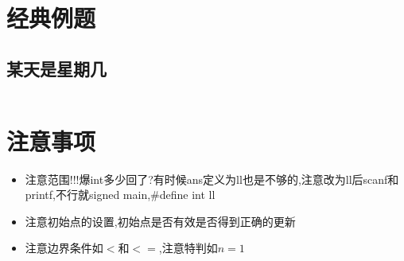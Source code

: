 \documentclass[a4paper,11pt]{article}
\begin{document}
\newpage
\section{经典例题}
\subsection{某天是星期几}
\inputminted[breaklines]{c++}{question/1.cpp}



\newpage
\section{注意事项}
\begin{itemize}
    \item 注意范围!!!爆int多少回了?有时候ans定义为ll也是不够的,注意改为ll后scanf和printf,不行就signed main,\#define int ll
    \item 注意初始点的设置,初始点是否有效是否得到正确的更新
    \item 注意边界条件如$<$和$<=$,注意特判如$n=1$
\end{itemize}
\end{document}
